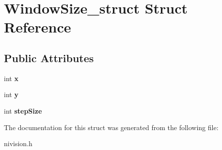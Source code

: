 \hypertarget{structWindowSize__struct}{
\section{WindowSize\_\-struct Struct Reference}
\label{structWindowSize__struct}
}
\subsection*{Public Attributes}
\begin{DoxyCompactItemize}
\item 
\hypertarget{structWindowSize__struct_a26813761b863bfc51a85da6a0aa9c01e}{
int {\bfseries x}}
\label{structWindowSize__struct_a26813761b863bfc51a85da6a0aa9c01e}

\item 
\hypertarget{structWindowSize__struct_a6910a7a077ea8db9d9f79c0b1d4b5602}{
int {\bfseries y}}
\label{structWindowSize__struct_a6910a7a077ea8db9d9f79c0b1d4b5602}

\item 
\hypertarget{structWindowSize__struct_ad34774755b70c3fc1e48332689d727c1}{
int {\bfseries stepSize}}
\label{structWindowSize__struct_ad34774755b70c3fc1e48332689d727c1}

\end{DoxyCompactItemize}


The documentation for this struct was generated from the following file:\begin{DoxyCompactItemize}
\item 
nivision.h\end{DoxyCompactItemize}
